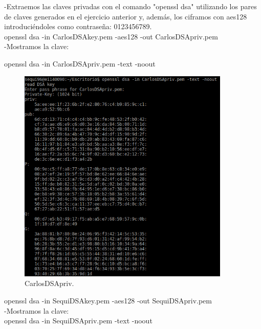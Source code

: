 -Extraemos las claves privadas con el comando "openssl dsa" utilizando los pares de claves generados en el ejercicio
anterior y, además, los ciframos con aes128 introduciéndoles como contraseña: 0123456789. \\

openssl dsa -in CarlosDSAkey.pem -aes128 -out CarlosDSApriv.pem\\

-Mostramos la clave:

openssl dsa -in CarlosDSApriv.pem -text -noout

\begin{figure}[h]
	\centering
	\includegraphics[width=0.9\textwidth]{imagenes/CarlosDSApriv}
	\caption{CarlosDSApriv.}
\end{figure}

\newpage

openssl dsa -in SequiDSAkey.pem -aes128 -out SequiDSApriv.pem \\

-Mostramos la clave:\\

openssl dsa -in SequiDSApriv.pem -text -noout

